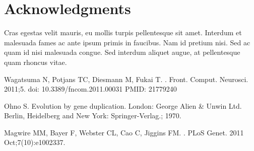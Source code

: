 \documentclass[10pt,letterpaper]{article}
\begin{document}
\section*{Acknowledgments}
Cras egestas velit mauris, eu mollis turpis pellentesque sit amet. Interdum et malesuada fames ac ante ipsum primis in faucibus. Nam id pretium nisi. Sed ac quam id nisi malesuada congue. Sed interdum aliquet augue, at pellentesque quam rhoncus vitae.

\nolinenumbers

%
%
% 
\begin{thebibliography}{10}

Wagatsuma N, Potjans TC, Diesmann M, Fukai T.
.
\newblock Front. Comput. Neurosci. 2011;5. doi: 10.3389/fncom.2011.00031 PMID: 21779240

Ohno S.
\newblock Evolution by gene duplication.
\newblock London: George Alien \& Unwin Ltd. Berlin, Heidelberg and New York:
  Springer-Verlag.; 1970.

Magwire MM, Bayer F, Webster CL, Cao C, Jiggins FM.
.
\newblock PLoS Genet. 2011 Oct;7(10):e1002337.

\end{thebibliography}
\end{document}
